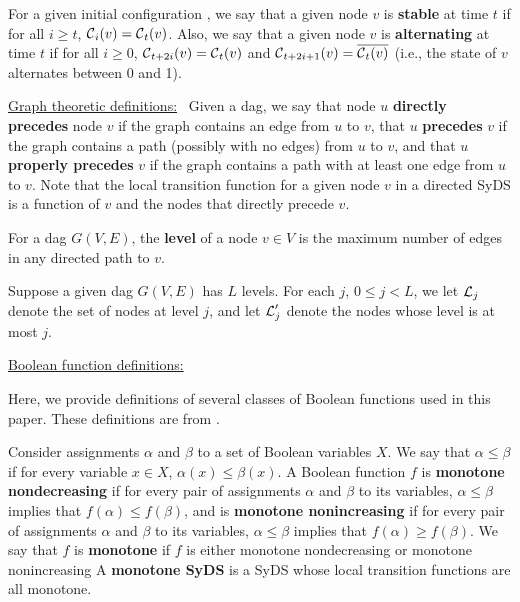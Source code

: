 For a given initial configuration \calc{},
we  say that a given node $v$ is \textbf{stable} at time $t$ if
for all $i \geq t$, $\mbox{$\mathcal{C}$}_i(v)= \mbox{$\mathcal{C}$}_t(v)$.
Also, we say that a given node $v$ is \textbf{alternating} at time $t$ if
for all $i \geq 0$, 
$\mbox{$\mathcal{C}$}_{t+2i}(v) =  \mbox{$\mathcal{C}$}_t(v)$ 
and $\mbox{$\mathcal{C}$}_{t+2i+1}(v) = \overline{ \mbox{$\mathcal{C}$}_t(v)}$ 
(i.e., the state of $v$ alternates between 0 and 1).  


\smallskip
\noindent
\underline{\textsf{Graph theoretic definitions:}}~
Given a dag, we say that node $u$ {\bf directly precedes}
node $v$ if the graph contains an edge from $u$ to $v$,
that $u$ {\bf precedes} $v$ if the graph contains a path (possibly
with no edges) from $u$ to $v$,
and that $u$ {\bf properly precedes} $v$
if the graph contains a path with at least one edge  from $u$ to $v$.
Note that the local transition function for a given node $v$  in a
directed SyDS is a function of $v$
and the nodes that directly precede $v$.

\begin{definition}\label{def:dag_level}
For a dag $G(V,E)$, 
the \textbf{level} of a node $v \in V$ is the maximum number
of edges in any directed path to $v$.
\end{definition}

Suppose a given dag $G(V,E)$ has $L$ levels. 
For each $j$, $0 \leq j < L$, we let $\mbox{$\mathcal{L}$}_j$ denote the set of nodes at level $j$,
and let $\mbox{$\mathcal{L}$}_j'$ denote the nodes whose level is at most $j$.

\smallskip
\noindent
\underline{\textsf{Boolean function definitions:}}~
\iffalse
A {\bf linear} Boolean function is one that can be expressed as a
linear equation mod 2 of its variables, i.e., the xor or complement
of the xor of its variables.  A {\bf linear SyDS} is a SyDS whose
local transition functions are all linear.
\fi
Here, we provide definitions of several classes of
Boolean functions used in this paper.
These definitions are from \cite{Crama-Hammer-2011,BH+06}.  

Consider assignments $\alpha$ and $\beta$
to a set of Boolean variables $X$.  We say that $\alpha \leq \beta$
if for every variable $x \in X$, $\alpha(x) \leq \beta(x)$.  A
Boolean function $f$  is {\bf monotone nondecreasing} if for every
pair of assignments $\alpha$ and $\beta$ to its variables, $\alpha
\leq \beta$ implies that $f(\alpha) \leq f(\beta)$, and is {\bf
monotone nonincreasing} if for every pair of assignments $\alpha$
and $\beta$ to its variables, $\alpha \leq \beta$ implies that
$f(\alpha) \geq f(\beta)$.  We say that $f$ is {\bf monotone} if
$f$ is either monotone nondecreasing or monotone nonincreasing A
{\bf monotone SyDS} is a SyDS whose local transition functions are
all monotone.

